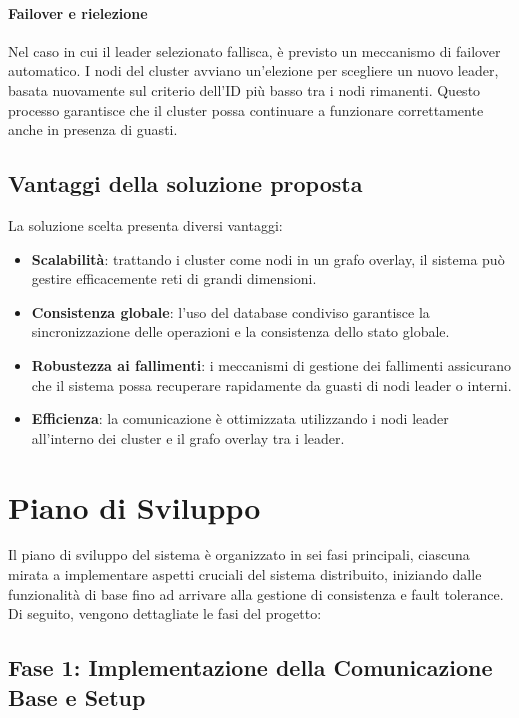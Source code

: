 \documentclass[12pt, a4paper]{report}
\begin{document}
\paragraph{Failover e rielezione}
Nel caso in cui il leader selezionato fallisca, \`e previsto un meccanismo di failover automatico. I nodi del cluster avviano un'elezione per scegliere un nuovo leader, basata nuovamente sul criterio dell'ID pi\`u basso tra i nodi rimanenti. Questo processo garantisce che il cluster possa continuare a funzionare correttamente anche in presenza di guasti.

\newpage
\subsection{Vantaggi della soluzione proposta}

La soluzione scelta presenta diversi vantaggi:

\begin{itemize}
    \item \textbf{Scalabilit\`a}: trattando i cluster come nodi in un grafo overlay, il sistema pu\`o gestire efficacemente reti di grandi dimensioni.
    \item \textbf{Consistenza globale}: l'uso del database condiviso garantisce la sincronizzazione delle operazioni e la consistenza dello stato globale.
    \item \textbf{Robustezza ai fallimenti}: i meccanismi di gestione dei fallimenti assicurano che il sistema possa recuperare rapidamente da guasti di nodi leader o interni.
    \item \textbf{Efficienza}: la comunicazione \`e ottimizzata utilizzando i nodi leader all'interno dei cluster e il grafo overlay tra i leader.
\end{itemize}

\section{Piano di Sviluppo}

Il piano di sviluppo del sistema \`e organizzato in sei fasi principali, ciascuna mirata a implementare aspetti cruciali del sistema distribuito, iniziando dalle funzionalit\`a di base fino ad arrivare alla gestione di consistenza e fault tolerance. Di seguito, vengono dettagliate le fasi del progetto:

\subsection*{Fase 1: Implementazione della Comunicazione Base e Setup}
\end{document}
